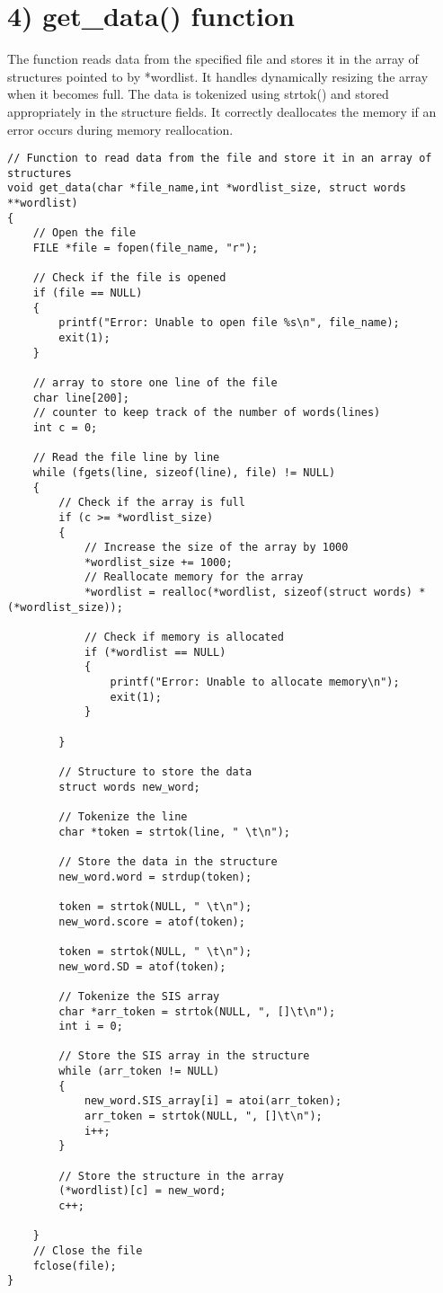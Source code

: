 \documentclass[a4paper,11pt]{article}
\theoremstyle{mytheor}
\begin{document}
\section*{4) get\_data() function}
The function reads data from the specified file and stores it in the array of structures pointed to by *wordlist. It handles dynamically resizing the array when it becomes full. The data is tokenized using strtok() and stored appropriately in the structure fields. It correctly deallocates the memory if an error occurs during memory reallocation.
\begin{lstlisting}[label={list:fourth},caption=get\_data() function]
// Function to read data from the file and store it in an array of structures
void get_data(char *file_name,int *wordlist_size, struct words **wordlist)
{
    // Open the file
    FILE *file = fopen(file_name, "r");

    // Check if the file is opened
    if (file == NULL)
    {
        printf("Error: Unable to open file %s\n", file_name);
        exit(1);
    }

    // array to store one line of the file 
    char line[200];
    // counter to keep track of the number of words(lines)
    int c = 0;

    // Read the file line by line
    while (fgets(line, sizeof(line), file) != NULL)
    {
        // Check if the array is full
        if (c >= *wordlist_size)
        {
            // Increase the size of the array by 1000
            *wordlist_size += 1000;
            // Reallocate memory for the array
            *wordlist = realloc(*wordlist, sizeof(struct words) * (*wordlist_size));

            // Check if memory is allocated
            if (*wordlist == NULL)
            {
                printf("Error: Unable to allocate memory\n");
                exit(1);
            }

        }

        // Structure to store the data
        struct words new_word;

        // Tokenize the line
        char *token = strtok(line, " \t\n");

        // Store the data in the structure
        new_word.word = strdup(token);

        token = strtok(NULL, " \t\n");
        new_word.score = atof(token);

        token = strtok(NULL, " \t\n");
        new_word.SD = atof(token);

        // Tokenize the SIS array
        char *arr_token = strtok(NULL, ", []\t\n");
        int i = 0;

        // Store the SIS array in the structure
        while (arr_token != NULL)
        {
            new_word.SIS_array[i] = atoi(arr_token);
            arr_token = strtok(NULL, ", []\t\n");
            i++;
        }

        // Store the structure in the array
        (*wordlist)[c] = new_word;
        c++;

    }
    // Close the file
    fclose(file);
}

\end{lstlisting}
\end{document}
